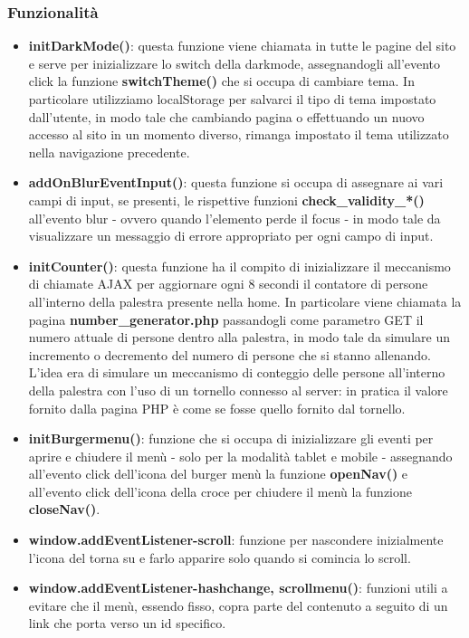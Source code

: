 \documentclass[a4paper]{article}
\begin{document}
	\subsubsection{Funzionalità}
	\begin{itemize}
		\item \textbf{initDarkMode()}: questa funzione viene chiamata in tutte le pagine del sito e serve per inizializzare lo switch della darkmode, assegnandogli all'evento click la funzione \textbf{switchTheme()} che si occupa di cambiare tema. In particolare utilizziamo localStorage per salvarci il tipo di tema impostato dall'utente, in modo tale che cambiando pagina o effettuando un nuovo accesso al sito in un momento diverso, rimanga impostato il tema utilizzato nella navigazione precedente.
		\item \textbf{addOnBlurEventInput()}: questa funzione si occupa di assegnare ai vari campi di input, se presenti, le rispettive funzioni \textbf{check\_validity\_*()} all'evento blur - ovvero quando l'elemento perde il focus - in modo tale da visualizzare un messaggio di errore appropriato per ogni campo di input.
		\item \textbf{initCounter()}: questa funzione ha il compito di inizializzare il meccanismo di chiamate AJAX per aggiornare ogni 8 secondi il contatore di persone all'interno della palestra presente nella home. In particolare viene chiamata la pagina \textbf{number\_generator.php} passandogli come parametro GET il numero attuale di persone dentro alla palestra, in modo tale da simulare un incremento o decremento del numero di persone che si stanno allenando. L'idea era di simulare un meccanismo di conteggio delle persone all'interno della palestra con l'uso di un tornello connesso al server: in pratica il valore fornito dalla pagina PHP è come se fosse quello fornito dal tornello.
		\item \textbf{initBurgermenu()}: funzione che si occupa di inizializzare gli eventi per aprire e chiudere il menù - solo per la modalità tablet e mobile - assegnando all'evento click dell'icona del burger menù la funzione \textbf{openNav()} e all'evento click dell'icona della croce per chiudere il menù la funzione \textbf{closeNav()}.
		\item \textbf{window.addEventListener-scroll}: funzione per nascondere inizialmente l'icona del torna su e farlo apparire solo quando si comincia lo scroll.
		\item \textbf{window.addEventListener-hashchange, scrollmenu()}: funzioni utili a evitare che il menù, essendo fisso, copra parte del contenuto a seguito di un link che porta verso un id specifico.

\end{itemize}
\end{document}
